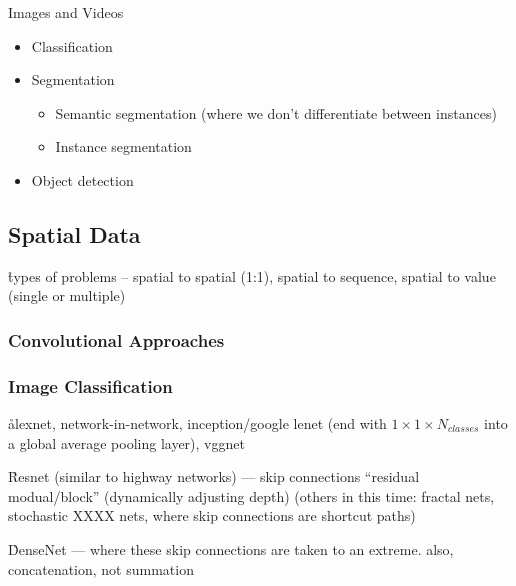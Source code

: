 



Images and Videos
\begin{itemize}[noitemsep,topsep=0pt]
	\item Classification
	\item Segmentation
	\begin{itemize}[noitemsep,topsep=0pt]
		\item Semantic segmentation (where we don't differentiate between instances)
		\item Instance segmentation
	\end{itemize}
	\item Object detection
\end{itemize}


\subsection{Spatial Data}

\r{types of problems -- spatial to spatial (1:1), spatial to sequence, spatial to value (single or multiple)}

\subsubsection{Convolutional Approaches}



\subsubsection{Image Classification}
\r{alexnet, network-in-network, inception/google lenet (end with $1 \times 1 \times N_{classes}$ into a global average pooling layer), vggnet}

\r{Resnet (similar to highway networks) --- skip connections ``residual modual/block'' (dynamically adjusting depth) (others in this time: fractal nets, stochastic XXXX nets, where skip connections are shortcut paths)}

\r{DenseNet --- where these skip connections are taken to an extreme. also, concatenation, not summation}

